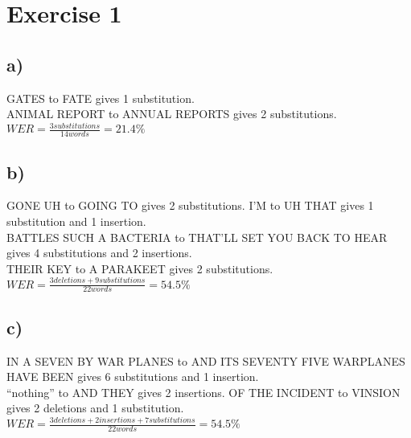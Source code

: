 \section*{Exercise 1} %
\label{sec:Exercise 1}

\subsection*{a)} %
\label{sub:a}
GATES to  FATE gives 1 substitution. \\
ANIMAL REPORT to ANNUAL REPORTS gives 2 substitutions. \\
$WER = \frac{3 substitutions}{14 words} = 21.4\%$



\subsection*{b)} %
\label{sub:b}
GONE UH to GOING TO gives 2 substitutions.
I'M to UH THAT gives 1 substitution and  1 insertion.\\
BATTLES SUCH A BACTERIA to THAT’LL SET YOU BACK TO HEAR gives 4 substitutions and 2 insertions. \\
THEIR KEY to A PARAKEET gives 2 substitutions. \\

$WER = \frac{3 deletions + 9 substitutions}{22 words} = 54.5\%$



\subsection*{c)} %
\label{sub:c}
IN A SEVEN BY WAR PLANES to AND ITS SEVENTY FIVE WARPLANES HAVE BEEN gives 6 substitutions and 1 insertion. \\
``nothing'' to AND THEY gives 2 insertions.
OF THE INCIDENT to VINSION gives 2 deletions and 1 substitution. \\
 
$WER = \frac{3 deletions + 2 insertions + 7 substitutions}{22 words} = 54.5\%$



